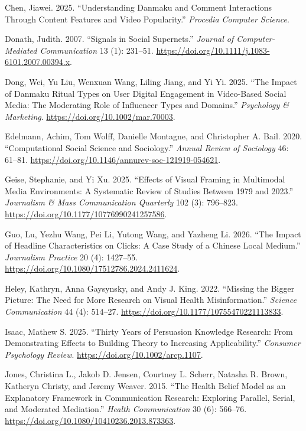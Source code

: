\documentclass[
  12pt,
]{article}
\newlength{\cslhangindent}
\newenvironment{CSLReferences}[2] %
 {\begin{list}{}{%
  \setlength{\itemindent}{0pt}
  \setlength{\leftmargin}{0pt}
  \setlength{\parsep}{0pt}
  \ifodd #1
   \setlength{\leftmargin}{\cslhangindent}
   \setlength{\itemindent}{-1\cslhangindent}
  \fi
  \setlength{\itemsep}{#2\baselineskip}}}
 {\end{list}}
\begin{document}
\begin{CSLReferences}{1}{0}
Chen, Jiawei. 2025. {``Understanding Danmaku and Comment Interactions
Through Content Features and Video Popularity.''} \emph{Procedia
Computer Science}.

Donath, Judith. 2007. {``Signals in Social Supernets.''} \emph{Journal
of Computer-Mediated Communication} 13 (1): 231--51.
\url{https://doi.org/10.1111/j.1083-6101.2007.00394.x}.

Dong, Wei, Yu Liu, Wenxuan Wang, Liling Jiang, and Yi Yi. 2025. {``The
Impact of Danmaku Ritual Types on User Digital Engagement in Video-Based
Social Media: The Moderating Role of Influencer Types and Domains.''}
\emph{Psychology \& Marketing}. \url{https://doi.org/10.1002/mar.70003}.

Edelmann, Achim, Tom Wolff, Danielle Montagne, and Christopher A. Bail.
2020. {``Computational Social Science and Sociology.''} \emph{Annual
Review of Sociology} 46: 61--81.
\url{https://doi.org/10.1146/annurev-soc-121919-054621}.

Geise, Stephanie, and Yi Xu. 2025. {``Effects of Visual Framing in
Multimodal Media Environments: A Systematic Review of Studies Between
1979 and 2023.''} \emph{Journalism \& Mass Communication Quarterly} 102
(3): 796--823. \url{https://doi.org/10.1177/10776990241257586}.

Guo, Lu, Yezhu Wang, Pei Li, Yutong Wang, and Yazheng Li. 2026. {``The
Impact of Headline Characteristics on Clicks: A Case Study of a
{Chinese} Local Medium.''} \emph{Journalism Practice} 20 (4): 1427--55.
\url{https://doi.org/10.1080/17512786.2024.2411624}.

Heley, Kathryn, Anna Gaysynsky, and Andy J. King. 2022. {``Missing the
Bigger Picture: The Need for More Research on Visual Health
Misinformation.''} \emph{Science Communication} 44 (4): 514--27.
\url{https://doi.org/10.1177/10755470221113833}.

Isaac, Mathew S. 2025. {``Thirty Years of Persuasion Knowledge Research:
From Demonstrating Effects to Building Theory to Increasing
Applicability.''} \emph{Consumer Psychology Review}.
\url{https://doi.org/10.1002/arcp.1107}.

Jones, Christina L., Jakob D. Jensen, Courtney L. Scherr, Natasha R.
Brown, Katheryn Christy, and Jeremy Weaver. 2015. {``The {Health}
{Belief} {Model} as an Explanatory Framework in Communication Research:
Exploring Parallel, Serial, and Moderated Mediation.''} \emph{Health
Communication} 30 (6): 566--76.
\url{https://doi.org/10.1080/10410236.2013.873363}.


\end{CSLReferences}
\end{document}
